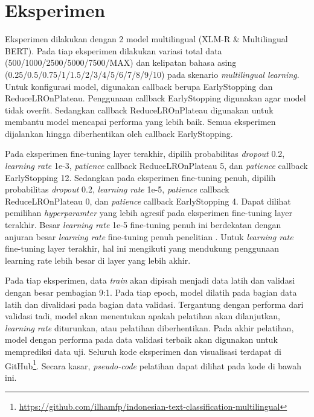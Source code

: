 \section{Eksperimen}
Eksperimen dilakukan dengan 2 model multilingual (XLM-R \& Multilingual BERT). Pada tiap eksperimen dilakukan variasi total data (500/1000/2500/5000/7500/MAX) dan kelipatan bahasa asing (0.25/0.5/0.75/1/1.5/2/3/4/5/6/7/8/9/10) pada skenario \textit{multilingual learning}. Untuk konfigurasi model, digunakan callback berupa EarlyStopping dan ReduceLROnPlateau. Penggunaan callback EarlyStopping digunakan agar model tidak overfit. Sedangkan callback ReduceLROnPlateau digunakan untuk membantu model mencapai performa yang lebih baik. Semua eksperimen dijalankan hingga diberhentikan oleh callback EarlyStopping.

Pada eksperimen fine-tuning layer terakhir, dipilih probabilitas \textit{dropout} 0.2, \textit{learning rate} 1e-3, \textit{patience} callback ReduceLROnPlateau 5, dan \textit{patience} callback EarlyStopping 12. Sedangkan pada eksperimen fine-tuning penuh, dipilih probabilitas \textit{dropout} 0.2, \textit{learning rate} 1e-5, \textit{patience} callback ReduceLROnPlateau 0, dan \textit{patience} callback EarlyStopping 4. Dapat dilihat pemilihan \textit{hyperparamter} yang lebih agresif pada eksperimen fine-tuning layer terakhir. Besar \textit{learning rate} 1e-5 fine-tuning penuh ini berdekatan dengan anjuran besar \textit{learning rate} fine-tuning penuh penelitian \parencite{Devlin_Chang_Lee_Toutanova_2019}. Untuk \textit{learning rate} fine-tuning layer terakhir, hal ini mengikuti \parencite{Peters_Ruder_Smith_2019} yang mendukung penggunaan learning rate lebih besar di layer yang lebih akhir. 

Pada tiap eksperimen, data \textit{train} akan dipisah menjadi data latih dan validasi dengan besar pembagian 9:1. Pada tiap epoch, model dilatih pada bagian data latih dan divalidasi pada bagian data validasi. Tergantung dengan performa dari validasi tadi, model akan menentukan apakah pelatihan akan dilanjutkan, \textit{learning rate} diturunkan, atau pelatihan diberhentikan. Pada akhir pelatihan, model dengan performa pada data validasi terbaik akan digunakan untuk memprediksi data uji. Seluruh kode eksperimen dan visualisasi terdapat di GitHub\footnote{\url{https://github.com/ilhamfp/indonesian-text-classification-multilingual}}. Secara kasar, \textit{pseudo-code} pelatihan dapat dilihat pada kode di bawah ini. 

